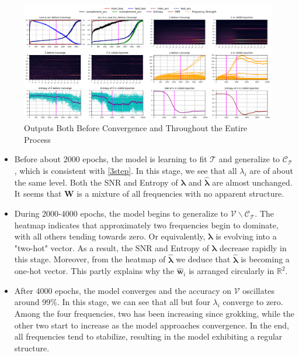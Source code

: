 \documentclass{article}
\begin{document}
\begin{figure}[htbp]
  \centering
  \includegraphics[width=\textwidth]{./pic/f.png}
  \caption{Outputs Both Before Convergence and Throughout the Entire Process}
  \label{f}
\end{figure}

\begin{itemize}
    \item Before about 2000 epochs, the model is learning to fit $\mathcal{T}$ and generalize to $\mathcal{C_T}$, which is consistent with \eqref{3step}. In this stage, we see that all $\lambda_i$ are of about the same level. Both the SNR and Entropy of $\bm\lambda$ and $\bm{\widehat{\lambda}}$ are almost unchanged. It seems that $\bm W$ is a mixture of all frequencies with no apparent structure.

    \item During 2000-4000 epochs, the model begins to generalize to $\mathcal{V}\backslash\mathcal{C_T}$. The heatmap indicates that approximately two frequencies begin to dominate, with all others tending towards zero. Or equivalently, $\bm\lambda$ is evolving into a "two-hot" vector. As a result, the SNR and Entropy of $\bm\lambda$ decrease rapidly in this stage. Moreover, from the heatmap of $\bm{\widehat\lambda}$ we deduce that $\bm{\widehat\lambda}$ is becoming a one-hot vector. This partly explains why the $\widehat{\bm w}_i$ is arranged circularly in $\mathbb{R}^2$.

    \item After 4000 epochs, the model converges and the accuracy on $\mathcal{V}$ oscillates around 99\%. In this stage, we can see that all but four $\lambda_i$ converge to zero. Among the four frequencies, two has been increasing since grokking, while the other two start to increase as the model approaches convergence. In the end, all frequencies tend to stabilize, resulting in the model exhibiting a regular structure.
\end{itemize}
\end{document}

